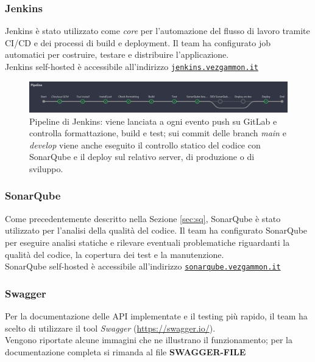 \documentclass{article}
\begin{document}
\subsubsection{Jenkins}
Jenkins è stato utilizzato come \textit{core} per l'automazione del flusso di lavoro tramite CI/CD e dei processi di build e deployment. Il team ha configurato job automatici per 
costruire, testare e distribuire l'applicazione. \\
Jenkins self-hosted è accessibile all'indirizzo \href{https://jenkins.vezgammon.it}{\texttt{jenkins.vezgammon.it}}

\begin{figure}[H]
    \centering
    \includegraphics[width=1\textwidth]{jk_pipeline}
    \caption{Pipeline di Jenkins: viene lanciata a ogni evento push su GitLab e controlla formattazione, build e test; sui commit delle branch \textit{main} e \textit{develop} viene anche eseguito
    il controllo statico del codice con SonarQube e il deploy sul relativo server, di produzione o di sviluppo.}
    \label{fig:jk_pipeline}
\end{figure}

\subsubsection{SonarQube}
Come precedentemente descritto nella Sezione \ref{sec:sq}, SonarQube è stato utilizzato per l'analisi della qualità del codice. Il team ha configurato SonarQube per eseguire analisi statiche e rilevare eventuali problematiche 
riguardanti la qualità del codice, la copertura dei test e la manutenzione. \\
SonarQube self-hosted è accessibile all'indirizzo \href{https://sonarqube.vezgammon.it}{\texttt{sonarqube.vezgammon.it}}

\subsubsection{Swagger}

Per la documentazione delle API implementate e il testing più rapido, il team ha scelto di utilizzare il tool \textit{Swagger} (\url{https://swagger.io/}). \\
Vengono riportate alcune immagini che ne illustrano il funzionamento; per la documentazione completa si rimanda al file \textbf{SWAGGER-FILE}
\end{document}
